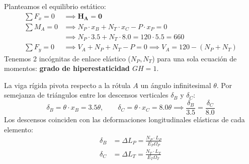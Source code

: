 {    \begin{center}
    \end{center}

    Planteamos el equilibrio estático:
    \begin{align}
        \sum F_x = 0 & \implies \mathbf{H_A = 0}                                         \\
        \sum M_A = 0 & \implies N_P \cdot x_B + N_T \cdot x_C - P \cdot x_P = 0          \\
                     & \implies N_P \cdot 3.5 + N_T \cdot 8.0 = 120 \cdot 5.5 = 660      \\
        \sum F_y = 0 & \implies V_A + N_P + N_T - P = 0 \implies V_A = 120 - (N_P + N_T)
    \end{align}
    Tenemos 2 incógnitas de enlace elástico ($N_P, N_T$) para una sola ecuación de momentos: \textbf{grado de hiperestaticidad $GH = 1$}.


    La viga rígida pivota respecto a la rótula $A$ un ángulo infinitesimal $\theta$. Por semejanza de triángulos entre los descensos verticales $\delta_B$ y $\delta_C$:
    \begin{equation}
        \delta_B = \theta \cdot x_B = 3.5 \theta, \qquad \delta_C = \theta \cdot x_C = 8.0 \theta \implies \frac{\delta_B}{3.5} = \frac{\delta_C}{8.0}
    \end{equation}
    Los descensos coinciden con las deformaciones longitudinales elásticas de cada elemento:
    \begin{align}
        \delta_B & = \Delta L_P = \frac{N_P \cdot L_P}{E_P \Omega_P} \\
        \delta_C & = \Delta L_T = \frac{N_T \cdot L_T}{E_T \Omega_T}
    \end{align}

}
